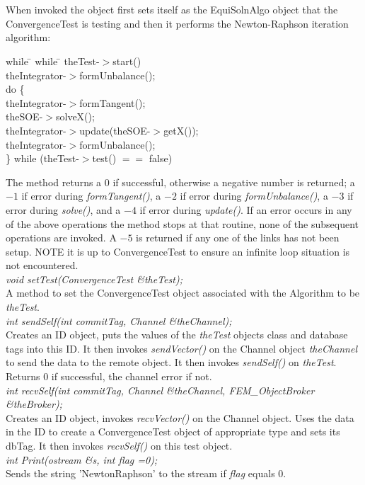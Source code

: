   \\
 \\
When invoked the object first sets itself as the EquiSolnAlgo object
that the ConvergenceTest is testing and then it performs the
Newton-Raphson iteration algorithm: 
\begin{tabbing}
while \= \+ while \= \kill
theTest-$>$start() \\
theIntegrator-$>$formUnbalance(); \\
do \{ \+ \\
theIntegrator-$>$formTangent(); \\
theSOE-$>$solveX(); \\
theIntegrator-$>$update(theSOE-$>$getX()); \\
theIntegrator-$>$formUnbalance(); \- \\
\} while (theTest-$>$test() $==$ false)\- 
\end{tabbing}

\noindent The method returns a 0 if successful, otherwise a negative number is
returned; a $-1$ if error during {\em formTangent()}, a $-2$ if
error during {\em formUnbalance()}, a $-3$ if error during {\em
solve()}, and a $-4$ if error during {\em update()}.
If an error occurs in any of the above operations the method stops at
that routine, none of the subsequent operations are invoked. A $-5$ is
returned if any one of the links has not been setup. NOTE it is up to
ConvergenceTest to ensure an infinite loop situation is not encountered. \\

{\em void setTest(ConvergenceTest \&theTest);} \\
A method to set the ConvergenceTest object associated with the
Algorithm to be {\em theTest}. \\

{\em int sendSelf(int commitTag, Channel \&theChannel);}\\
Creates an ID object, puts the values of the {\em theTest} objects
class and database tags into this ID. It then invokes {\em
sendVector()} on the Channel object {\em theChannel} to send the data
to the remote object. It then invokes {\em sendSelf()} on {\em
theTest}. Returns $0$ if successful, the channel error if not. \\

{\em int recvSelf(int commitTag, Channel \&theChannel, FEM\_ObjectBroker
\&theBroker);}\\ 
Creates an ID object, invokes {\em recvVector()} on the Channel
object. Uses the data in the ID to create a ConvergenceTest object of
appropriate type and sets its dbTag. It then invokes {\em recvSelf()}
on this test object. \\

{\em int Print(ostream \&s, int flag =0);} \\
Sends the string 'NewtonRaphson' to the stream if {\em flag} equals $0$.